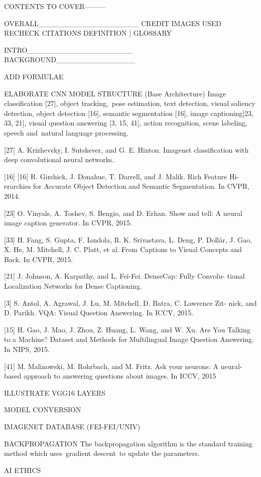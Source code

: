 CONTENTS TO COVER---------

OVERALL___________________
CREDIT IMAGES USED
RECHECK CITATIONS
DEFINITION | GLOSSARY


INTRO____________________
BACKGROUND_______________

ADD FORMULAE

ELABORATE CNN MODEL STRUCTURE (Base Architecture)
Image classification [27], object tracking, pose estimation, text detection, visual saliency detection, object detection [16], semantic segmentation [16], image captioning[23, 33, 21], visual question answering [3, 15, 41], action recognition, scene labeling, speech and natural language processing.

[27] A. Krizhevsky, I. Sutskever, and G. E. Hinton. Imagenet classification with deep convolutional neural networks.

[16] [16] R. Girshick, J. Donahue, T. Darrell, and J. Malik. Rich Feature Hi- erarchies for Accurate Object Detection and Semantic Segmentation. In CVPR, 2014.

[23] O. Vinyals, A. Toshev, S. Bengio, and D. Erhan. Show and tell: A neural image caption generator. In CVPR, 2015.

[33] H. Fang, S. Gupta, F. Iandola, R. K. Srivastava, L. Deng, P. Dollár, J. Gao, X. He, M. Mitchell, J. C. Platt, et al. From Captions to Visual Concepts and Back. In CVPR, 2015.

[21] J. Johnson, A. Karpathy, and L. Fei-Fei. DenseCap: Fully Convolu- tional Localization Networks for Dense Captioning. 

[3] S. Antol, A. Agrawal, J. Lu, M. Mitchell, D. Batra, C. Lawrence Zit- nick, and D. Parikh. VQA: Visual Question Answering. In ICCV, 2015.

[15] H. Gao, J. Mao, J. Zhou, Z. Huang, L. Wang, and W. Xu. Are You Talking to a Machine? Dataset and Methods for Multilingual Image Question Answering. In NIPS, 2015.

[41] M. Malinowski, M. Rohrbach, and M. Fritz. Ask your neurons: A neural-based approach to answering questions about images. In ICCV, 2015

ILLUSTRATE VGG16 LAYERS

MODEL CONVERSION

IMAGENET DATABASE (FEI-FEI/UNIV)

BACKPROPAGATION
The backpropagation algorithm is the standard training method which uses gradient descent to update the parameters.

AI ETHICS

